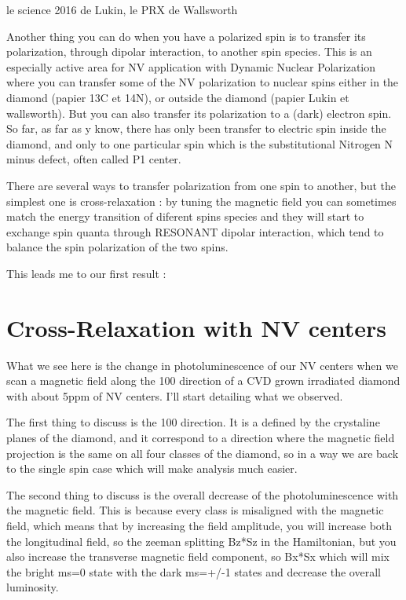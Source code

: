 \documentclass[a4paper]{article}
\begin{document}
le science 2016 de Lukin, le PRX de Wallsworth

Another thing you can do when you have a polarized spin is to transfer its polarization, through dipolar interaction,  to another spin species. This is an especially active area for NV application with Dynamic Nuclear Polarization where you can transfer some of the NV polarization to nuclear spins either in the diamond (papier 13C et 14N), or outside the diamond (papier Lukin et wallsworth).
But you can also transfer its polarization to a (dark) electron spin. So far, as far as y know, there has only been transfer to electric spin inside the diamond, and only to one particular spin which is the substitutional Nitrogen N minus defect, often called P1 center.

There are several ways to transfer polarization from one spin to another, but the simplest one is cross-relaxation : by tuning the magnetic field you can sometimes match the energy transition of diferent spins species and they will start to exchange spin quanta through RESONANT dipolar interaction, which tend to balance the spin polarization of the two spins.
 
This leads me to our first result :
\section{Cross-Relaxation with NV centers}
What we see here is the change in photoluminescence of our NV centers when we scan a magnetic field along the 100 direction of a CVD grown irradiated diamond with about 5ppm of NV centers. I'll start detailing what we observed.

The first thing to discuss is the 100 direction. It is a defined by the crystaline planes of the diamond, and it correspond to a direction where the magnetic field projection is the same on all four classes of the diamond, so in a way we are back to the single spin case which will make analysis much easier.

The second thing to discuss is the overall decrease of the photoluminescence with the magnetic field. This is because every class is misaligned with the magnetic field, which means that by increasing the field amplitude, you will increase both the longitudinal field, so the zeeman splitting Bz*Sz in the Hamiltonian, but you also increase the transverse magnetic field component, so Bx*Sx which will mix the bright ms=0 state with the dark ms=+/-1 states and decrease the overall luminosity.
\end{document}
